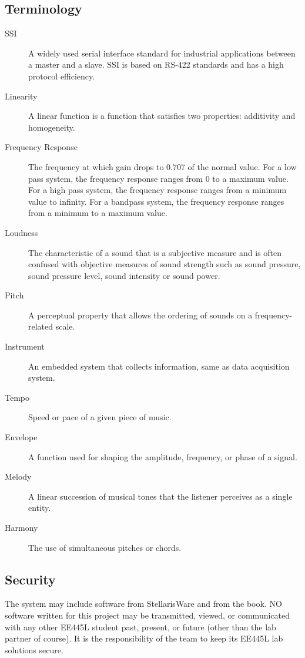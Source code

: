 \documentclass{article}
\begin{document}
	\subsection{Terminology}
		\begin{description}
			\item[SSI]
				A widely used serial interface standard for industrial applications between a master and a slave. SSI is based on RS-422 standards and has a high protocol efficiency.
			\item[Linearity]
				A linear function is a function that satisfies two properties: additivity and homogeneity.
			\item[Frequency Response]
				The frequency at which gain drops to 0.707 of the normal value. For a low pass system, the frequency response ranges from 0 to a maximum value. For a high pass system, the frequency response ranges from a minimum value to infinity. For a bandpass system, the frequency response ranges from a minimum to a maximum value.
			\item[Loudness]
				The characteristic of a sound that is a subjective measure and is often confused with objective measures of sound strength such as sound pressure, sound pressure level, sound intensity or sound power.
			\item[Pitch]
				A perceptual property that allows the ordering of sounds on a frequency-related scale.
			\item[Instrument]
				An embedded system that collects information, same as data acquisition system.
			\item[Tempo]
				Speed or pace of a given piece of music.
			\item[Envelope]
				A function used for shaping the amplitude, frequency, or phase of a signal.
			\item[Melody]
				A linear succession of musical tones that the listener perceives as a single entity.
			\item[Harmony]
				The use of simultaneous pitches or chords.
		\end{description}
	\subsection{Security}
		The system may include software from StellarisWare and from the book. NO software written for this project may be transmitted, viewed, or communicated with any other EE445L student past, present, or future (other than the lab partner of course). It is the responsibility of the team to keep its EE445L lab solutions secure.
\end{document}
